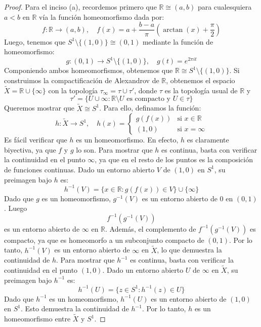 \documentclass{article}
\theoremstyle{plain}
\theoremstyle{definition}
\newcommand{\R}{\mathbb{R}}
\begin{document}
\begin{proof}
    Para el inciso (a), recordemos primero que \( \R \cong (a, b) \) para cualesquiera \( a < b \) en \( \R \) vía la función homeomorfismo dada por:
    \[ f : \R \longrightarrow (a, b), \quad f(x) = a + \frac{b - a}{\pi} \left( \arctan(x) + \frac{\pi}{2} \right) \]
    Luego, tenemos que \( S^1 \setminus \{ (1, 0) \} \cong (0, 1) \) mediante la función de homeomorfismo:
    \[ g : (0, 1) \longrightarrow S^1 \setminus \{ (1, 0) \}, \quad g(t) = e^{2\pi i t} \]
    Componiendo ambos homeomorfismos, obtenemos que \( \R \cong S^1 \setminus \{ (1, 0) \} \). Si construimos la compactificación de Alexandrov de \( \R \),
    obtenemos el espacio \( \tilde{X} = \R \cup \{ \infty \} \) con la topología \( \tau_\infty = \tau \cup \tau' \), donde \( \tau \) es la topología usual
    de \( \R \) y \[
        \tau' = \{ U \cup \infty : \R \setminus U \text{ es compacto y } U \in \tau \}
    \]
    Queremos mostrar que \( \tilde{X} \cong S^1 \). Para ello, definamos la función:
    \[ h : \tilde{X} \longrightarrow S^1, \quad h(x) = \begin{cases}
            g(f(x)) & \text{si } x \in \R   \\
            (1, 0)  & \text{si } x = \infty
        \end{cases} \]
    Es fácil verificar que \( h \) es un homeomorfismo. En efecto, \( h \) es claramente biyectiva, ya que \( f \) y \( g \) lo son.
    Para mostrar que \( h \) es continua, basta con verificar la continuidad en el punto \( \infty \), ya que en el resto de los puntos es la composición
    de funciones continuas. Dado un entorno abierto \( V \) de \( (1, 0) \) en \( S^1 \), su preimagen bajo \( h \) es:
    \[ h^{-1}(V) = \{ x \in \R : g(f(x)) \in V \} \cup \{ \infty \} \]
    Dado que \( g \) es un homeomorfismo, \( g^{-1}(V) \) es un entorno abierto de \( 0 \) en \( (0, 1) \). Luego
    \[ f^{-1}(g^{-1}(V)) \] es un entorno abierto de \( \infty \) en \( \R \). Además, el complemento de \( f^{-1}(g^{-1}(V)) \) es compacto, ya que
    es homeomorfo a un subconjunto compacto de \( (0, 1) \). Por lo tanto, \( h^{-1}(V) \) es un entorno abierto de \( \infty \) en \( \tilde{X} \), lo que demuestra la continuidad de \( h \).
    Para mostrar que \( h^{-1} \) es continua, basta con verificar la continuidad en el punto \( (1, 0) \). Dado un entorno abierto \( U \) de \( \infty \) en \( \tilde{X} \), su preimagen bajo \( h^{-1} \) es:
    \[ h^{-1}(U) = \{ z \in S^1 : h^{-1}(z) \in U \} \]
    Dado que \( h^{-1} \) es un homeomorfismo, \( h^{-1}(U) \) es un entorno abierto de \( (1, 0) \) en \( S^1 \). Esto demuestra la continuidad de \( h^{-1} \). Por lo tanto, \( h \) es un homeomorfismo entre
    \( \tilde{X} \) y \( S^1 \).


\end{proof}
\end{document}
